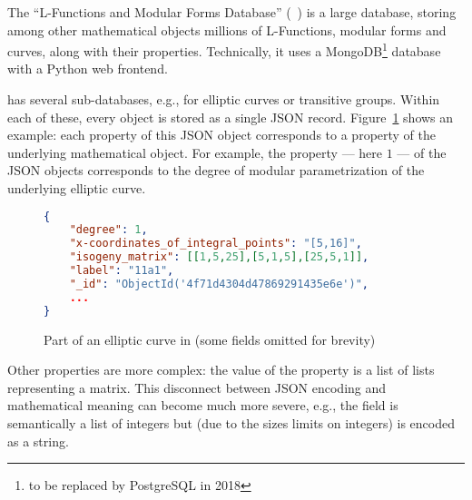 The ``L-Functions and Modular Forms Database'' (\lmfdb~\cite{lmfdb}) is a large database, storing among other mathematical objects millions of L-Functions, modular forms and curves, along with their properties.
Technically, it uses a MongoDB\footnote{to be replaced by PostgreSQL in 2018} database with a Python web frontend.

\lmfdb has several sub-databases, e.g., for elliptic curves or transitive groups. 
Within each of these, every object is stored as a single JSON record.
Figure~\ref{fig:lmfdbexample} shows an example: each property of this JSON object corresponds to a property of the underlying mathematical object. 
For example, the  property --- here $1$ --- of the JSON objects corresponds to the degree of modular parametrization of the underlying elliptic curve. 

\begin{figure}[ht]\centering
\begin{lstlisting}[language=json]
{
    "degree": 1,
    "x-coordinates_of_integral_points": "[5,16]",
    "isogeny_matrix": [[1,5,25],[5,1,5],[25,5,1]],
    "label": "11a1",
    "_id": "ObjectId('4f71d4304d47869291435e6e')",
    ...
}
\end{lstlisting}\vspace*{-1.5em}
  \caption[An elliptic curve from \lmfdb]{
    Part of an elliptic curve in \lmfdb (some fields omitted for brevity)
  }
  \label{fig:lmfdbexample}
\end{figure}

Other properties are more complex: the value of the  property is a list of lists representing a matrix. 
This disconnect between JSON encoding and mathematical meaning can become much more severe, e.g., the  field is semantically a list of integers but (due to the sizes limits on integers) is encoded as a string.

